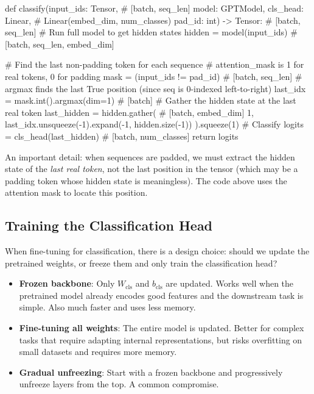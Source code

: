 \begin{pseudocode}
def classify(input_ids: Tensor,       # [batch, seq_len]
             model: GPTModel,
             cls_head: Linear,          # Linear(embed_dim, num_classes)
             pad_id: int) -> Tensor:    # [batch, seq_len]
    # Run full model to get hidden states
    hidden = model(input_ids)           # [batch, seq_len, embed_dim]

    # Find the last non-padding token for each sequence
    # attention_mask is 1 for real tokens, 0 for padding
    mask = (input_ids != pad_id)        # [batch, seq_len]
    # argmax finds the last True position (since seq is 0-indexed left-to-right)
    last_idx = mask.int().argmax(dim=1)  # [batch]
    # Gather the hidden state at the last real token
    last_hidden = hidden.gather(           # [batch, embed_dim]
        1, last_idx.unsqueeze(-1).expand(-1, hidden.size(-1))
    ).squeeze(1)
    # Classify
    logits = cls_head(last_hidden)        # [batch, num_classes]
    return logits
\end{pseudocode}

\begin{keyconcept}
  An important detail: when sequences are padded, we must extract the
  hidden state of the \emph{last real token}, not the last position in
  the tensor (which may be a padding token whose hidden state is
  meaningless). The code above uses the attention mask to locate this
  position.
\end{keyconcept}

\subsection{Training the Classification Head}

When fine-tuning for classification, there is a design choice: should
we update the pretrained weights, or freeze them and only train the
classification head?

\begin{itemize}
  \item \textbf{Frozen backbone}: Only $W_{\text{cls}}$ and
        $b_{\text{cls}}$ are updated. Works well when the pretrained
        model already encodes good features and the downstream task is
        simple. Also much faster and uses less memory.
  \item \textbf{Fine-tuning all weights}: The entire model is updated.
        Better for complex tasks that require adapting internal
        representations, but risks overfitting on small datasets and
        requires more memory.
  \item \textbf{Gradual unfreezing}: Start with a frozen backbone and
        progressively unfreeze layers from the top. A common compromise.
\end{itemize}

